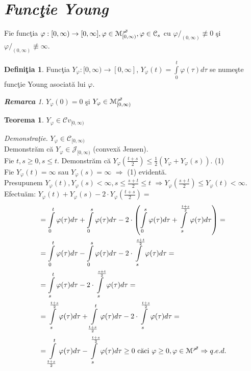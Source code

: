 \documentclass[ a4paper, 12pt]{report}
\newtheorem{theorem}{\bf Teorema}[section]
\theoremstyle{definition}
\newtheorem{definition}{\bf Defini\c tia}[section]
\theoremstyle{remark}
\newtheorem{remarc}{\bf Remarca}[section]
\numberwithin{equation}{section}
\begin{document}
\section{\textit{Func\c tie Young}}
Fie func\c tia $\varphi : [0,\infty) \rightarrow [0,\infty], \varphi \in \mathcal{M}_{[0,\infty)}^{\mc}, \varphi \in \mathcal{C}_s $ cu $\varphi/_{(0,\infty)} \not\equiv 0$ \c si $\varphi/_ {(0,\infty)}\not\equiv \infty$.
\begin{definition}
Func\c tia $Y_\varphi : [0,\infty) \rightarrow [0,\infty]$, $Y_\varphi(t) = \int\limits_{0}^{t}\varphi(\tau) d\tau$ se nume\c ste func\c tie Young asociat\u a lui $\varphi$.
\end{definition}
\begin{remarc}
$Y_\varphi (0) = 0$ \c si $Y_\varphi \in \mathcal{M}_{[0,\infty)}^{\mc}$
\end{remarc}
\begin{theorem}
$Y_\varphi \in \mathcal{C}v_{[0,\infty)}$
\end{theorem}
\textit{Demonstra\c tie.}
$Y_\varphi \in \mathcal{C}_{[0,\infty)}$
\\Demonstr\u am c\u a $Y_\varphi \in \mathcal{J}_{[0,\infty)}$ (convex\u a Jensen).\\
Fie $t,s\geq 0, s\leq t$. Demonstr\u am c\u a
$Y_\varphi(\frac{t+s}{2})\leq \frac{1}{2}(Y_\varphi + Y_\varphi (s)).$ \hspace{20mm} (1) \\
Fie $Y_\varphi (t) = \infty$ sau $Y_\varphi (s) = \infty$ $\Rightarrow$ (1) evident\u a.\\
Presupunem $Y_\varphi (t),Y_\varphi (s) < \infty,  s\leq\frac{s+t}{2}\leq t $
$\Rightarrow Y_\varphi (\frac{s+t}{2}) \leq Y_\varphi (t)<\infty.$
Efectu\u am:
$Y_\varphi (t) + Y_\varphi (s) - 2 \cdot Y_\varphi (\frac{t+s}{2})=$
\begin{align*}
&=\int\limits_{0}^{t} \varphi(\tau)d\tau + \int\limits_{0}^{s} \varphi(\tau)d\tau - 2 \cdot \left(\int\limits_{0}^{s} \varphi(\tau)d\tau + \int\limits_{s}^{\frac{t+s}{2}} \varphi(\tau)d\tau\right)=\\
&=\int\limits_{0}^{t} \varphi(\tau)d\tau - \int\limits_{0}^{s} \varphi(\tau)d\tau - 2 \cdot \int\limits_{s}^{\frac{s+t}{2}} \varphi(\tau)d\tau =\\
&=\int\limits_{s}^{t} \varphi(\tau)d\tau - 2 \cdot\int\limits_{s}^{\frac{s+t}{2}} \varphi(\tau)d\tau=\\
&=\int\limits_{s}^{\frac{t+s}{2}} \varphi(\tau)d\tau + \int\limits_{\frac{t+s}{2}}^{t} \varphi(\tau)d\tau - 2 \cdot \int\limits_{s}^{\frac{t+s}{2}}\varphi(\tau)d\tau=\\
&=\int\limits_{\frac{t+s}{2}}^{t} \varphi(\tau)d\tau - \int\limits_{s}^{\frac{t+s}{2}} \varphi(\tau)d\tau \geq 0 \ \mbox{c\u aci} \  \varphi \geq 0, \varphi \in \mathcal{M}^{\mc}\Rightarrow q.e.d.
\end{align*}
\end{document}
